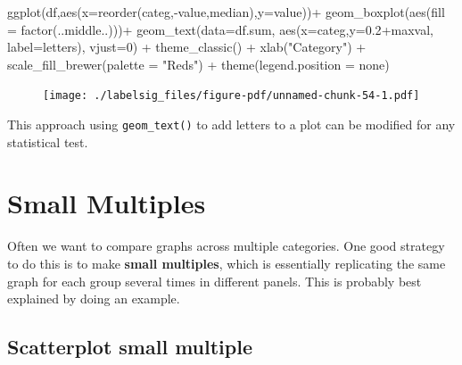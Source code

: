\documentclass[
  letterpaper,
  DIV=11,
  numbers=noendperiod]{scrreprt}
\newenvironment{Shaded}{\begin{snugshade}}{\end{snugshade}}
\newcommand{\AttributeTok}[1]{\textcolor[rgb]{0.40,0.45,0.13}{#1}}
\newcommand{\DecValTok}[1]{\textcolor[rgb]{0.68,0.00,0.00}{#1}}
\newcommand{\FloatTok}[1]{\textcolor[rgb]{0.68,0.00,0.00}{#1}}
\newcommand{\FunctionTok}[1]{\textcolor[rgb]{0.28,0.35,0.67}{#1}}
\newcommand{\NormalTok}[1]{\textcolor[rgb]{0.00,0.23,0.31}{#1}}
\newcommand{\SpecialCharTok}[1]{\textcolor[rgb]{0.37,0.37,0.37}{#1}}
\newcommand{\StringTok}[1]{\textcolor[rgb]{0.13,0.47,0.30}{#1}}
\begin{document}
\begin{Shaded}
\begin{Highlighting}[]
\FunctionTok{ggplot}\NormalTok{(df,}\FunctionTok{aes}\NormalTok{(}\AttributeTok{x=}\FunctionTok{reorder}\NormalTok{(categ,}\SpecialCharTok{{-}}\NormalTok{value,median),}\AttributeTok{y=}\NormalTok{value))}\SpecialCharTok{+}
  \FunctionTok{geom\_boxplot}\NormalTok{(}\FunctionTok{aes}\NormalTok{(}\AttributeTok{fill =} \FunctionTok{factor}\NormalTok{(..middle..)))}\SpecialCharTok{+}
  \FunctionTok{geom\_text}\NormalTok{(}\AttributeTok{data=}\NormalTok{df.sum,}
            \FunctionTok{aes}\NormalTok{(}\AttributeTok{x=}\NormalTok{categ,}\AttributeTok{y=}\FloatTok{0.2}\SpecialCharTok{+}\NormalTok{maxval,}
                \AttributeTok{label=}\NormalTok{letters), }\AttributeTok{vjust=}\DecValTok{0}\NormalTok{) }\SpecialCharTok{+}
  \FunctionTok{theme\_classic}\NormalTok{() }\SpecialCharTok{+}
  \FunctionTok{xlab}\NormalTok{(}\StringTok{"Category"}\NormalTok{) }\SpecialCharTok{+}
  \FunctionTok{scale\_fill\_brewer}\NormalTok{(}\AttributeTok{palette =} \StringTok{"Reds"}\NormalTok{) }\SpecialCharTok{+}
  \FunctionTok{theme}\NormalTok{(}\AttributeTok{legend.position =} \StringTok{\textquotesingle{}none\textquotesingle{}}\NormalTok{)}
\end{Highlighting}
\end{Shaded}

\begin{figure}[H]

{\centering \texttt{[image: ./labelsig\_files/figure-pdf/unnamed-chunk-54-1.pdf]}

}

\end{figure}

This approach using \texttt{geom\_text()} to add letters to a plot can
be modified for any statistical test.


\hypertarget{small-multiples}{%
\chapter{Small Multiples}\label{small-multiples}}

Often we want to compare graphs across multiple categories. One good
strategy to do this is to make \textbf{small multiples}, which is
essentially replicating the same graph for each group several times in
different panels. This is probably best explained by doing an example.

\hypertarget{scatterplot-small-multiple}{%
\section{\texorpdfstring{\textbf{Scatterplot small
multiple}}{Scatterplot small multiple}}\label{scatterplot-small-multiple}}
\end{document}
